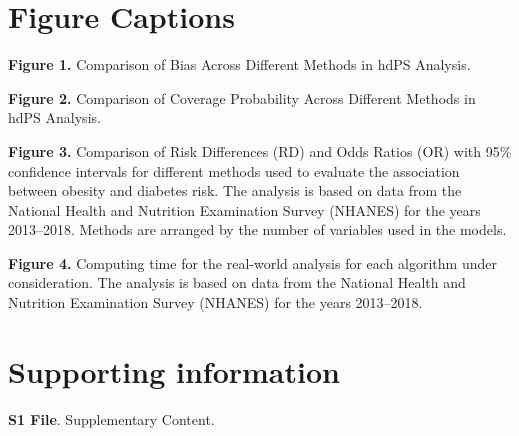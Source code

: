 \documentclass[10pt,letterpaper]{article}
\begin{document}
\nolinenumbers

\section*{Figure Captions}

\textbf{Figure 1.} Comparison of Bias Across Different Methods in hdPS Analysis.

\textbf{Figure 2.} Comparison of Coverage Probability Across Different Methods in hdPS Analysis.

\textbf{Figure 3.} Comparison of Risk Differences (RD) and Odds Ratios (OR) with 95\% confidence intervals for different methods used to evaluate the association between obesity and diabetes risk. The analysis is based on data from the National Health and Nutrition Examination Survey (NHANES) for the years 2013--2018. Methods are arranged by the number of variables used in the models.

\textbf{Figure 4.} Computing time for the real-world analysis for each algorithm under consideration. The analysis is based on data from the National Health and Nutrition Examination Survey (NHANES) for the years 2013--2018.


\section*{Supporting information}

\textbf{S1 File}.  Supplementary Content.
\end{document}
